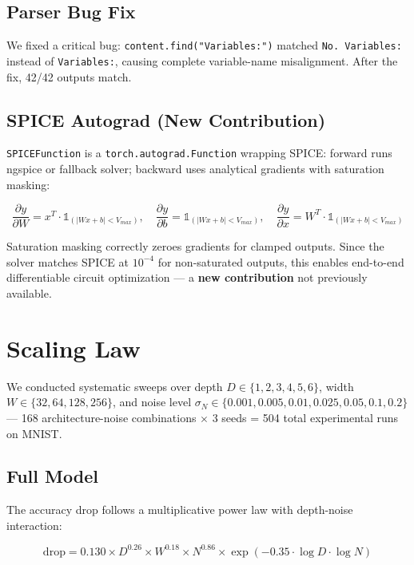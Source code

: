 \documentclass[10pt,twocolumn]{article}
\begin{document}
\subsection{Parser Bug Fix}

We fixed a critical bug: \texttt{content.find("Variables:")} matched \texttt{No.\ Variables:} instead of \texttt{Variables:}, causing complete variable-name misalignment. After the fix, 42/42 outputs match.

\subsection{SPICE Autograd (New Contribution)}

\texttt{SPICEFunction} is a \texttt{torch.autograd.Function} wrapping SPICE: forward runs ngspice or fallback solver; backward uses analytical gradients with saturation masking:

\begin{equation}
\frac{\partial y}{\partial W} = x^T \cdot \mathbb{1}_{(|Wx+b| < V_{max})}, \quad
\frac{\partial y}{\partial b} = \mathbb{1}_{(|Wx+b| < V_{max})}, \quad
\frac{\partial y}{\partial x} = W^T \cdot \mathbb{1}_{(|Wx+b| < V_{max})}
\end{equation}

Saturation masking correctly zeroes gradients for clamped outputs. Since the solver matches SPICE at $10^{-4}$ for non-saturated outputs, this enables end-to-end differentiable circuit optimization --- a \textbf{new contribution} not previously available.

\section{Scaling Law}

We conducted systematic sweeps over depth $D \in \{1,2,3,4,5,6\}$, width $W \in \{32,64,128,256\}$, and noise level $\sigma_N \in \{0.001,0.005,0.01,0.025,0.05,0.1,0.2\}$ --- 168 architecture-noise combinations $\times$ 3 seeds = 504 total experimental runs on MNIST.

\subsection{Full Model}

The accuracy drop follows a multiplicative power law with depth-noise interaction:

\begin{equation}
\text{drop} = 0.130 \times D^{0.26} \times W^{0.18} \times N^{0.86} \times \exp(-0.35 \cdot \log D \cdot \log N)
\end{equation}
\end{document}
